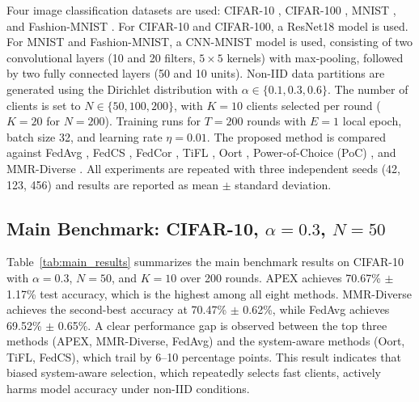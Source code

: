 \documentclass[journal]{IEEEtran}
\begin{document}
Four image classification datasets are used: CIFAR-10 \cite{krizhevsky2009learning}, CIFAR-100 \cite{krizhevsky2009learning}, MNIST \cite{lecun1998gradient}, and Fashion-MNIST \cite{xiao2017fashionmnist}. For CIFAR-10 and CIFAR-100, a ResNet18 model \cite{he2016deep} is used. For MNIST and Fashion-MNIST, a CNN-MNIST model is used, consisting of two convolutional layers (10 and 20 filters, $5 \times 5$ kernels) with max-pooling, followed by two fully connected layers (50 and 10 units). Non-IID data partitions are generated using the Dirichlet distribution \cite{hsu2019measuring} with $\alpha \in \{0.1, 0.3, 0.6\}$. The number of clients is set to $N \in \{50, 100, 200\}$, with $K = 10$ clients selected per round ($K = 20$ for $N = 200$). Training runs for $T = 200$ rounds with $E = 1$ local epoch, batch size 32, and learning rate $\eta = 0.01$. The proposed method is compared against FedAvg \cite{mcmahan2017communication}, FedCS \cite{nishio2019client}, FedCor \cite{tang2022fedcor}, TiFL \cite{chai2020tifl}, Oort \cite{lai2021oort}, Power-of-Choice (PoC) \cite{cho2022towards}, and MMR-Diverse \cite{carbonara2024mmr}. All experiments are repeated with three independent seeds (42, 123, 456) and results are reported as mean $\pm$ standard deviation.

\subsection{Main Benchmark: CIFAR-10, $\alpha = 0.3$, $N = 50$}

Table~\ref{tab:main_results} summarizes the main benchmark results on CIFAR-10 with $\alpha = 0.3$, $N = 50$, and $K = 10$ over 200 rounds. APEX achieves 70.67\% $\pm$ 1.17\% test accuracy, which is the highest among all eight methods. MMR-Diverse achieves the second-best accuracy at 70.47\% $\pm$ 0.62\%, while FedAvg achieves 69.52\% $\pm$ 0.65\%. A clear performance gap is observed between the top three methods (APEX, MMR-Diverse, FedAvg) and the system-aware methods (Oort, TiFL, FedCS), which trail by 6--10 percentage points. This result indicates that biased system-aware selection, which repeatedly selects fast clients, actively harms model accuracy under non-IID conditions.
\end{document}

